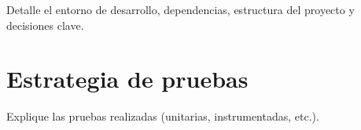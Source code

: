 Detalle el entorno de desarrollo, dependencias, estructura del proyecto y decisiones clave.
\section*{Estrategia de pruebas}
Explique las pruebas realizadas (unitarias, instrumentadas, etc.).
